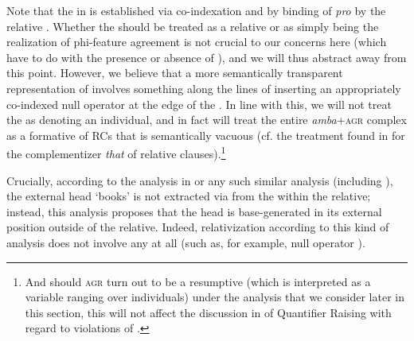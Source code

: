 \documentclass[output=paper
,newtxmath
,modfonts
,nonflat]{langsci/langscibook}
\begin{document}
Note that the  in  is established via co-indexation and by binding of \textit{pro} by the relative . Whether the  should be treated as a relative  or as simply being the realization of phi-feature agreement is not crucial to our concerns here (which have to do with the presence or absence of ), and we will thus abstract away from this point. However, we believe that a more semantically transparent representation of  involves something along the lines of inserting an appropriately co-indexed null operator at the edge of the . In line with this, we will not treat the  as denoting an individual, and in fact will treat the entire \textit{amba}+\textsc{agr} complex as a formative of RCs that is semantically vacuous (cf. the treatment found in \citet{Heim1998} for the complementizer \textit{that} of  relative clauses).\footnote{And should \textsc{agr} turn out to be a resumptive  (which is interpreted as a variable ranging over individuals) under the  analysis that we consider later in this section, this will not affect the discussion in  of Quantifier Raising with regard to violations of .}

Crucially, according to the analysis in  or any such similar analysis (including \citealt{Barrett-Keach1985}), the external head ‘books’ is not extracted via  from the  within the relative; instead, this analysis proposes that the head is base-generated in its external position outside of the relative. Indeed, relativization according to this kind of analysis does not involve any  at all (such as, for example, null operator ).
\end{document}
